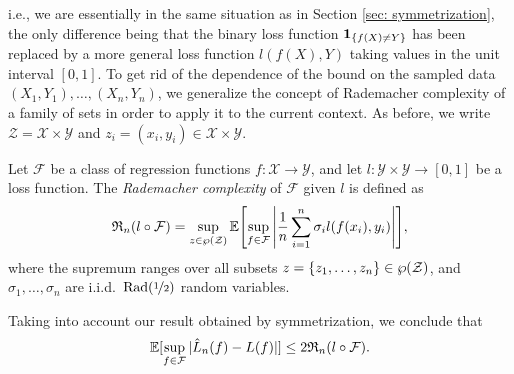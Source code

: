i.e., we are essentially in the same situation as in Section \ref{sec: symmetrization}, the only difference being that the binary loss function $\indSet{f(X) \neq Y}$ has been replaced by a more general loss function $l(f(X), Y)$ taking values in the unit interval $[0, 1]$. To get rid of the dependence of the bound on the sampled data $(X_1, Y_1), \dots, (X_n, Y_n)$, we generalize the concept of Rademacher complexity of a family of sets in order to apply it to the current context. As before, we write $\mathcal{Z} = \mathcal{X} \times \mathcal{Y}$ and $z_i = (x_i, y_i) \in \mathcal{X} \times \mathcal{Y}$.

\begin{definition}
\label{def: rademacher complexity for general loss}
Let $\mathcal{F}$ be a class of regression functions $f \colon \mathcal{X} \to \mathcal{Y}$, and let $l \colon \mathcal{Y} \times \mathcal{Y} \to [0, 1]$ be a loss function. The \emph{Rademacher complexity} of $\mathcal{F}$ given $l$ is defined as
\[
    \mathfrak{R}_n(l \circ \mathcal{F}) = \sup_{z \in \power(\mathcal{Z})} \Exp\left[\sup_{f \in \mathcal{F}} \abs{\frac{1}{n} \sum_{i=1}^n \sigma_i l(f(x_i), y_i)}\right],
\]
where the supremum ranges over all subsets $z = \set{z_1, \dots, z_n} \in \power(\mathcal{Z})$, and $\sigma_1, \dots, \sigma_n$ are i.i.d.\ $\operatorname{Rad}(\nicefrac{1}{2})$ random variables.
\end{definition}
Taking into account our result obtained by symmetrization, we conclude that
\[
    \Exp[\sup_{f \in \mathcal{F}} \abs*{\hat{L}_n(f) - L(f)}] \leq 2 \mathfrak{R}_n(l \circ \mathcal{F}).
\]

